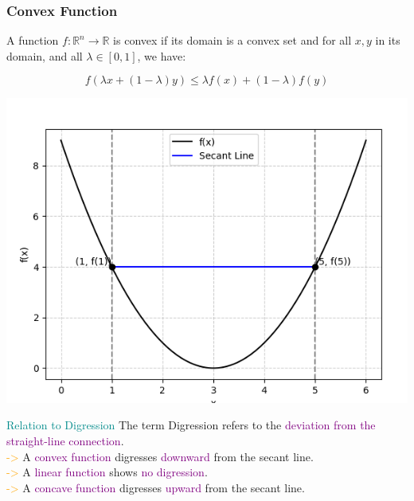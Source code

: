 \begin{frame}
    \frametitle{Convex Function}
    \vspace{0.3cm} %

    A function \( f : \mathbb{R}^{n} \to \mathbb{R} \) is convex if its domain is a convex set and for all \( x, y \) in its domain, and all \( \lambda \in [0, 1] \), we have:

    \[
    f( \lambda x +(1 - \lambda)y) \leq \lambda f (x) + (1 -\lambda )f(y)
    \]

    \begin{minipage}{0.48\linewidth}
        \centering
        \includegraphics[width=\linewidth]{graph.png} %
    \end{minipage}%
    \hfill
    \begin{minipage}{0.48\linewidth}
    \begin{block}{\textcolor{DarkCyan}{Relation to Digression}}
        \small %
        The term Digression refers to the \textcolor{purple}{deviation from the straight-line connection}. \\
        \textcolor{orange}{->} A \textcolor{purple}{convex function} digresses \textcolor{purple}{downward} from the secant line. \\
        \textcolor{orange}{->} A \textcolor{purple}{linear function} shows \textcolor{purple}{no digression}. \\
        \textcolor{orange}{->} A \textcolor{purple}{concave function} digresses \textcolor{purple}{upward} from the secant line.
        \end{block}
    \end{minipage}


    \vspace{0.5cm} %
\end{frame}


